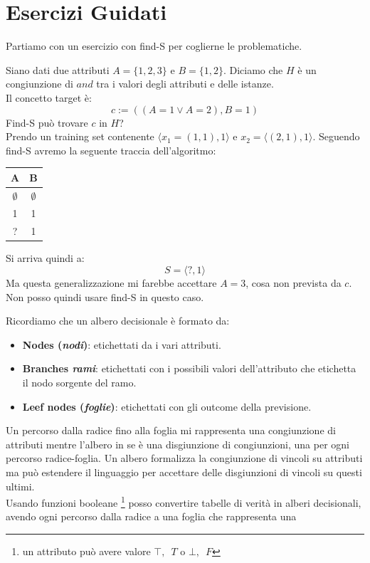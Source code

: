 \section{Esercizi Guidati}
Partiamo con un esercizio con find-S per coglierne le problematiche.
\begin{esercizio}
  Siano dati due attributi $A=\{1, 2, 3\}$ e $B=\{1, 2\}$. Diciamo che $H$ è un
  congiunzione di $and$ tra i valori degli attributi e delle istanze.\\
  Il concetto target è:
  \[c:=((A=1\lor A=2), B=1)\]
  Find-S può trovare $c$ in $H$?\\
  Prendo un training set contenente $\langle x_1=(1, 1), 1\rangle$ e
  $x_2=\langle(2, 1), 1\rangle$. Seguendo find-S 
  avremo la seguente traccia dell'algoritmo:
  \begin{table}[H]
    \centering
    \begin{tabular}{c|c}
      A & B\\
      \hline
      $\emptyset$ & $\emptyset$\\
      1 & 1 \\
      ? & 1
    \end{tabular}
  \end{table}
  Si arriva quindi a:
  \[S=\langle ?, 1\rangle\]
  Ma questa generalizzazione mi farebbe accettare $A=3$, cosa non prevista da
  $c$.\\
  Non posso quindi usare find-S in questo caso.
\end{esercizio}
Ricordiamo che un albero decisionale è formato da:
\begin{itemize}
  \item \textbf{Nodes (\textit{nodi})}: etichettati da i vari attributi.
  \item \textbf{Branches \textit{rami}}: etichettati con i possibili valori
  dell'attributo che etichetta il nodo sorgente del ramo.
  \item \textbf{Leef nodes (\textit{foglie})}: etichettati con gli outcome della
  previsione.
\end{itemize}
Un percorso dalla radice fino alla foglia mi rappresenta una congiunzione di
attributi mentre l'albero in se è una disgiunzione di congiunzioni, una
per ogni percorso radice-foglia. Un albero formalizza la congiunzione di
vincoli su attributi ma può estendere il linguaggio per accettare delle disgiunzioni di vincoli su questi ultimi.\\
Usando funzioni booleane \footnote{un attributo può avere valore $\top,\,\,\, T$ o
$\bot,\,\,\, F$} posso convertire tabelle di verità in alberi decisionali, avendo ogni percorso dalla radice a una foglia che rappresenta una
